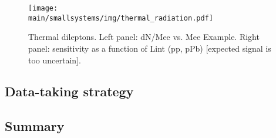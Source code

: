 \documentclass[../report.tex]{subfiles}
\providecommand{\main}{..}
\begin{document}
\begin{figure}[ht]
\centering
\texttt{[image: \\main/smallsystems/img/thermal\_radiation.pdf]}
\caption{Thermal dileptons. Left panel: dN/Mee vs. Mee Example. Right panel: sensitivity as a function of Lint (pp, pPb) [expected signal is too uncertain].}
\label{fig:smallsystems_thermal_radition}
\end{figure}

\subsection{Data-taking strategy}


\subsection{Summary}
\end{document}
